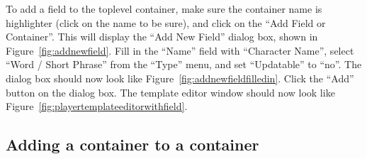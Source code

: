 To add a field to the toplevel container, make sure the container name
is highlighter (click on the name to be sure), and click on the ``Add
Field or Container''.  This will display the ``Add New Field'' dialog
box, shown in Figure~\ref{fig:addnewfield}.  Fill in the ``Name'' field
with ``Character Name'', select ``Word / Short Phrase'' from the
``Type'' menu, and set ``Updatable'' to ``no''.  The dialog box should
now look like Figure~\ref{fig:addnewfieldfilledin}.  Click the ``Add''
button on the dialog box.  The template editor window should now look
like Figure~\ref{fig:playertemplateeditorwithfield}.

\subsection{Adding a container to a container}

